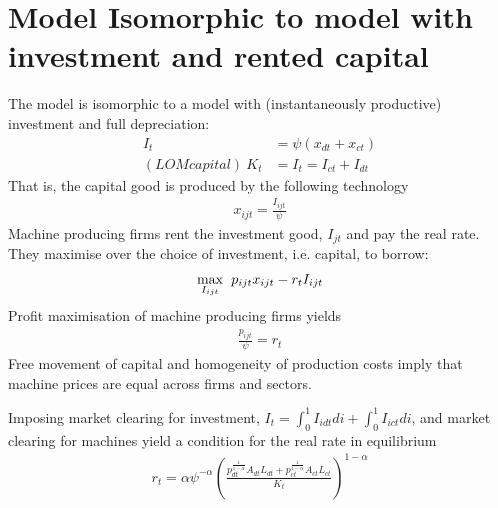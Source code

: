 \section{Model Isomorphic to model with investment and rented capital}
The model is isomorphic to a model with (instantaneously productive) investment and full depreciation: 
\begin{align*}
I_t&=\psi(x_{dt}+x_{ct})\\
(LOM capital) \ K_t&=I_t= I_{ct}+I_{dt}
\end{align*}
That is, the capital good is produced by the following technology
\begin{align*}
x_{ijt}=\frac{I_{ijt}}{\psi}
\end{align*}
Machine producing firms rent the investment good, $I_{jt}$ and pay the real rate. They maximise over the choice of investment, i.e. capital, to borrow:
\begin{align*}
\underset{I_{ijt}}{\max}\hspace{2mm}p_{ijt}x_{ijt}-r_tI_{ijt}
\end{align*}
Profit maximisation of machine producing firms yields
\begin{align*}
\frac{p_{ijt}}{\psi}=r_t
\end{align*}
Free movement of capital and homogeneity of production costs imply that machine prices are equal across firms and sectors. 

Imposing market clearing for investment, $I_t=\int_{0}^{1}I_{idt}di+\int_{0}^{1}I_{ict}di$, and market clearing for machines yield a condition for the real rate in equilibrium
\begin{align*}
r_t=\alpha \psi^{-\alpha}\left(\frac{p_{dt}^{\frac{1}{1-\alpha}}A_{dt}L_{dt}+p_{ct}^{\frac{1}{1-\alpha}}A_{ct}L_{ct}}{K_t}\right)^{1-\alpha}
\end{align*}

